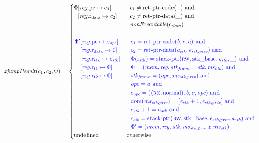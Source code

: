 \documentclass[a4paper]{article}
\begin{document}
\begin{align*}
  \xjumpResult{c_1}{c_2}{\Phi} = 
  \begin{cases}
    \arraycolsep=0pt
    \begin{array}[t]{rl}
      \Phi & \updReg{\pcreg}{c_1}\\
           & \updReg{\rdata}{c_2}
    \end{array} &
    \begin{array}[t]{l}
      c_1 \neq \retptrc(\_) \tand \\
      c_2 \neq \retptrd(\_) \tand \\
      \nonExec{c_\data}
    \end{array}
    \\&\\
    \sourcecolor\left.
      \arraycolsep=0pt
      \begin{array}[t]{rl}
        \Phi' & \updReg{\pcreg}{c_\opc}\\
              & \updReg{\rdata}{0}\\
              & \updReg{\rstk}{c_\stk}\\
              & \updReg{\rtmp{1}}{0}\\
              & \updReg{\rtmp{2}}{0}
      \end{array}\right.&
    \sourcecolor\left.
      \begin{array}[t]{l}
        c_1 = \retptrc(\baddr,\eaddr,\aaddr) \tand \\
        c_2 = \retptrd(\aaddr_\stk,\eaddr_{\stk,\priv}) \tand \\
        \Phi(\rstk) = \stkptr{\rw,\stkb,\eaddr_\stk,\_} \tand \\ 
        \Phi = (\mem,\reg,\stkf::\stk,\ms_\stk) \tand \\
        \stkf = (\opc,\ms_{\stk,\priv}) \tand \\
        \opc = \aaddr \tand \\
        c_\opc = ((\rx,\normal),\baddr,\eaddr,\opc) \tand \\
        \dom(\ms_{\stk,\priv}) = [\eaddr_\stk+1,\eaddr_{\stk,\priv}] \tand\\
        e_\stk + 1 = a_\stk \tand\\
        c_\stk = \stkptr{\rw,\stkb,\eaddr_{\stk,\priv},\aaddr_\stk} \tand\\
        \Phi' = (\mem,\reg,\stk,\ms_{\stk,\priv} \uplus \ms_\stk) 
      \end{array}\right.
    \\
    \tundefined & \totherwise
  \end{cases}
\end{align*}
\end{document}
